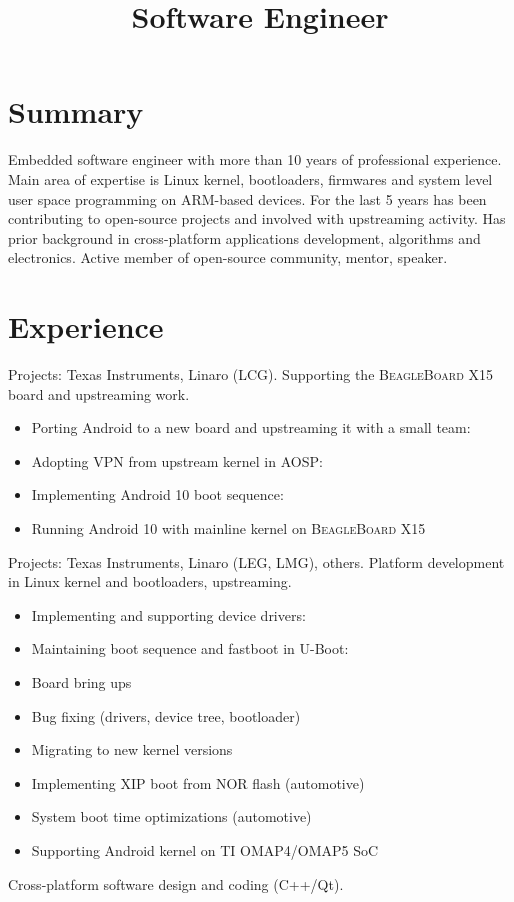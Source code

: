 \documentclass[11pt,a4paper]{moderncv}
\title{Software Engineer}
\begin{document}
\renewcommand*{\bibliographyhead}[1]{}

\maketitle

\section{Summary}

Embedded software engineer with more than 10 years of professional experience.
Main area of expertise is Linux kernel, bootloaders, firmwares and system level
user space programming on ARM-based devices. For the last 5 years has been
contributing to open-source projects and involved with upstreaming activity.
Has prior background in cross-platform applications development, algorithms and
electronics. Active member of open-source community, mentor, speaker.

\section{Experience}
  {Projects: Texas Instruments, Linaro (LCG). \newline{}
   Supporting the \textsc{BeagleBoard X15} board and upstreaming work.
   \begin{itemize}
     \item Porting Android to a new board and upstreaming it with a small team:
           \cite{a}
     \item Adopting VPN from upstream kernel in AOSP: \cite{b}
     \item Implementing Android 10 boot sequence: \cite{c}
     \item Running Android 10 with mainline kernel on \textsc{BeagleBoard X15}
   \end{itemize}}
  {Projects: Texas Instruments, Linaro (LEG, LMG), others. \newline{}
   Platform development in Linux kernel and bootloaders, upstreaming.
   \begin{itemize}
     \item Implementing and supporting device drivers: \cite{d}
     \item Maintaining boot sequence and fastboot in U-Boot: \cite{e}
     \item Board bring ups
     \item Bug fixing (drivers, device tree, bootloader)
     \item Migrating to new kernel versions
     \item Implementing XIP boot from NOR flash (automotive)
     \item System boot time optimizations (automotive)
     \item Supporting Android kernel on TI OMAP4/OMAP5 SoC
   \end{itemize}
  }
  {Cross-platform software design and coding (C++/Qt).}
\end{document}
